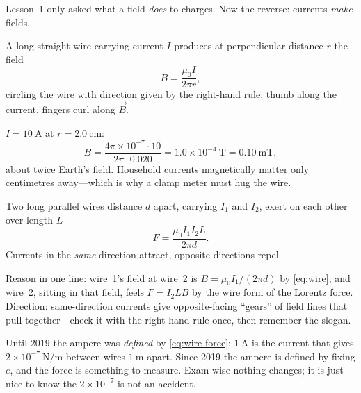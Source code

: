 Lesson~1 only asked what a field \emph{does} to charges. Now the reverse: currents \emph{make} fields.

\begin{theorem}\label{thm:wire}
A long straight wire carrying current $I$ produces at perpendicular distance $r$ the field
\begin{equation}\label{eq:wire}
  B = \frac{\mu_0 I}{2\pi r},
\end{equation}
circling the wire with direction given by the right-hand rule: thumb along the current, fingers curl along $\vec{B}$.
\end{theorem}

\begin{example}\label{exm:wire-number}
$I = 10\ \mathrm{A}$ at $r = 2.0\ \mathrm{cm}$:
\[
  B = \frac{4\pi\times 10^{-7}\cdot 10}{2\pi\cdot 0.020} = 1.0\times 10^{-4}\ \mathrm{T} = 0.10\ \mathrm{mT},
\]
about twice Earth's field. Household currents magnetically matter only centimetres away---which is why a clamp meter must hug the wire.
\end{example}

\begin{theorem}\label{thm:wire-force}
Two long parallel wires distance $d$ apart, carrying $I_1$ and $I_2$, exert on each other over length $L$
\begin{equation}\label{eq:wire-force}
  F = \frac{\mu_0 I_1 I_2 L}{2\pi d}.
\end{equation}
Currents in the \emph{same} direction attract, opposite directions repel.
\end{theorem}

Reason in one line: wire~1's field at wire~2 is $B = \mu_0 I_1/(2\pi d)$ by \cref{eq:wire}, and wire~2, sitting in that field, feels $F = I_2 L B$ by the wire form of the Lorentz force. Direction: same-direction currents give opposite-facing ``gears'' of field lines that pull together---check it with the right-hand rule once, then remember the slogan.

\begin{remark}\label{rmk:ampere}
Until 2019 the ampere was \emph{defined} by \cref{eq:wire-force}: $1\ \mathrm{A}$ is the current that gives $2\times 10^{-7}\ \mathrm{N/m}$ between wires $1\ \mathrm{m}$ apart. Since 2019 the ampere is defined by fixing $e$, and the force is something to measure. Exam-wise nothing changes; it is just nice to know the $2\times 10^{-7}$ is not an accident.
\end{remark}

